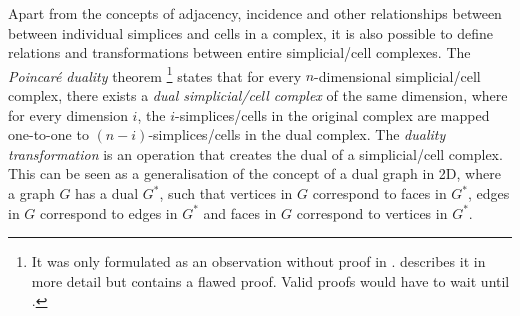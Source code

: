 Apart from the concepts of adjacency, incidence and other relationships between between individual simplices and cells in a complex, it is also possible to define relations and transformations between entire simplicial/cell complexes.
The \emph{Poincar\'e duality} theorem \citep{Poincare93}\footnote{It was only formulated as an observation without proof in \citet{Poincare93}. \citet{Poincare95} describes it in more detail but contains a flawed proof.
Valid proofs would have to wait until \citet{Poincare99,Poincare00}.} states that for every $n$-dimensional simplicial/cell complex, there exists a \emph{dual simplicial/cell complex} of the same dimension, where for every dimension $i$, the $i$-simplices/cells in the original complex are mapped one-to-one to $(n-i)$-simplices/cells in the dual complex.
The \emph{duality transformation} is an operation that creates the dual of a simplicial/cell complex.
This can be seen as a generalisation of the concept of a dual graph in 2D, where a graph $G$ has a dual $G^\ast$, such that vertices in $G$ correspond to faces in $G^\ast$, edges in $G$ correspond to edges in $G^\ast$ and faces in $G$ correspond to vertices in $G^\ast$.

